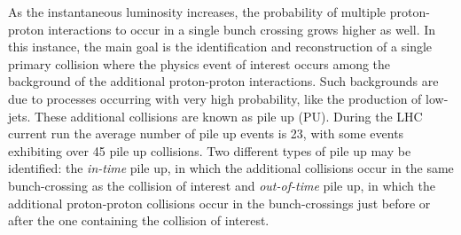 As the instantaneous luminosity increases, the probability of multiple proton-proton interactions to occur in a single bunch crossing grows higher as well. In this instance, the main goal is the identification and reconstruction of a single primary collision where the physics event of interest occurs among the background of the additional proton-proton interactions. Such backgrounds are due to processes occurring with very high probability, like the production of low-\pt jets. These additional collisions are known as pile up (PU). During the LHC current run the average number of pile up events is 23, with some events exhibiting over 45 pile up collisions. Two different types of pile up may be identified: the \emph{in-time} pile up, in which the additional collisions occur in the same bunch-crossing as the collision of interest and \emph{out-of-time} pile up, in which the additional proton-proton collisions occur in the bunch-crossings just before or after the one containing the collision of interest.










